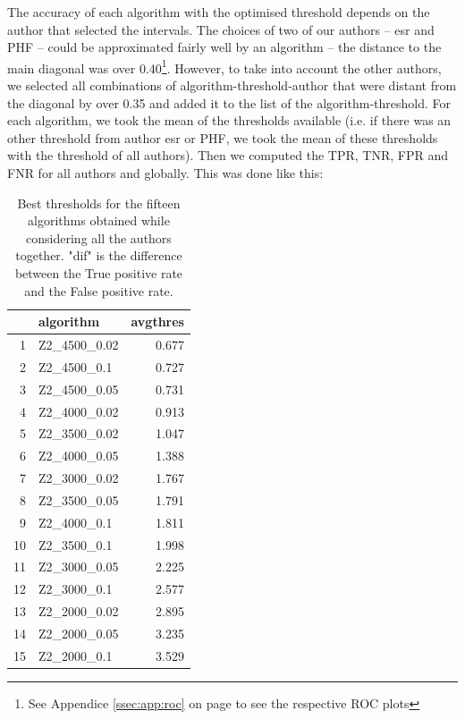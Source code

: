 \documentclass{article}\usepackage[]{graphicx}\usepackage[]{color}
\begin{document}
The accuracy of each algorithm with the optimised threshold depends on the author that selected the intervals. The choices of two of our authors -- esr and PHF -- could be approximated fairly well by an algorithm -- the distance to the main diagonal was over 0.40\footnote{See Appendice \ref{ssec:app:roc} on page \pageref{ssec:app:roc} to see the respective ROC plots}. However, to take into account the other authors, we selected all combinations of algorithm-threshold-author that were distant from the diagonal by over 0.35 and added it to the list of the algorithm-threshold. For each algorithm, we took the mean of the thresholds available (i.e. if there was an other threshold from author esr or PHF, we took the mean of these thresholds with the threshold of all authors). Then we computed the TPR, TNR, FPR and FNR for all authors and globally. This was done like this:
\begin{table}[ht]
\centering
\begin{tabular}{rlr}
  \hline
 & algorithm & avgthres \\ 
  \hline
1 & Z2\_4500\_0.02 & 0.677 \\ 
  2 & Z2\_4500\_0.1 & 0.727 \\ 
  3 & Z2\_4500\_0.05 & 0.731 \\ 
  4 & Z2\_4000\_0.02 & 0.913 \\ 
  5 & Z2\_3500\_0.02 & 1.047 \\ 
  6 & Z2\_4000\_0.05 & 1.388 \\ 
  7 & Z2\_3000\_0.02 & 1.767 \\ 
  8 & Z2\_3500\_0.05 & 1.791 \\ 
  9 & Z2\_4000\_0.1 & 1.811 \\ 
  10 & Z2\_3500\_0.1 & 1.998 \\ 
  11 & Z2\_3000\_0.05 & 2.225 \\ 
  12 & Z2\_3000\_0.1 & 2.577 \\ 
  13 & Z2\_2000\_0.02 & 2.895 \\ 
  14 & Z2\_2000\_0.05 & 3.235 \\ 
  15 & Z2\_2000\_0.1 & 3.529 \\ 
   \hline
\end{tabular}
\caption{Best thresholds for the fifteen algorithms obtained while considering all the authors together. "dif" is the difference between the True positive rate and the False positive rate.} 
\label{tab:comp}
\end{table}
\end{document}
